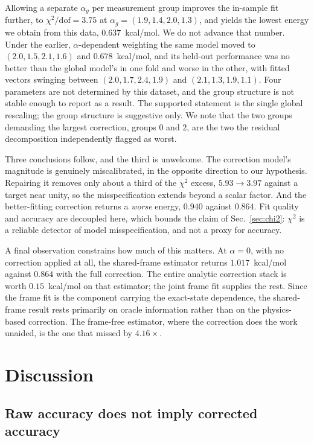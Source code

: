 \documentclass[aps,prx,twocolumn,superscriptaddress,nofootinbib,floatfix]{revtex4-2}
\begin{document}
Allowing a separate $\alpha_g$ per measurement group improves the
in-sample fit further, to $\chi^2/\mathrm{dof}=3.75$ at
$\alpha_g=(1.9,1.4,2.0,1.3)$, and yields the lowest energy we obtain from
this data, $0.637$~kcal/mol. We do not advance that number. Under the
earlier, $\alpha$-dependent weighting the same model moved to
$(2.0,1.5,2.1,1.6)$ and $0.678$~kcal/mol, and its held-out performance was
no better than the global model's in one fold and worse in the other, with
fitted vectors swinging between $(2.0,1.7,2.4,1.9)$ and
$(2.1,1.3,1.9,1.1)$. Four parameters are not determined by this dataset,
and the group structure is not stable enough to report as a result. The supported statement is the single global
rescaling; the group structure is suggestive only. We note that the two
groups demanding the largest correction, groups $0$ and $2$, are the two
the residual decomposition independently flagged as worst.

Three conclusions follow, and the third is unwelcome. The correction
model's magnitude is genuinely miscalibrated, in the opposite direction to
our hypothesis. Repairing it removes only about a third of the $\chi^2$
excess, $5.93\to3.97$ against a target near unity, so the misspecification
extends beyond a scalar factor. And the better-fitting correction returns a
\emph{worse} energy, $0.940$ against $0.864$. Fit
quality and accuracy are decoupled here, which bounds the claim of
Sec.~\ref{sec:chi2}: $\chi^2$ is a reliable detector of model
misspecification, and not a proxy for accuracy.

A final observation constrains how much of this matters. At $\alpha=0$,
with no correction applied at all, the shared-frame estimator returns
$1.017$~kcal/mol against $0.864$ with the full correction. The entire
analytic correction stack is worth $0.15$~kcal/mol on that estimator; the
joint frame fit supplies the rest. Since the frame fit is the component
carrying the exact-state dependence, the shared-frame result rests
primarily on oracle information rather than on the physics-based
correction. The frame-free estimator, where the correction does the work
unaided, is the one that missed by $4.16\times$.

\section{Discussion}

\subsection{Raw accuracy does not imply corrected accuracy}
\end{document}
